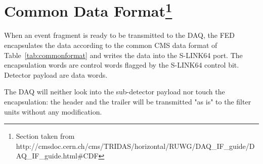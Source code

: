 \label{sec:CommonFormat}
\section[Common Data Format]{Common Data Format\footnote{Section taken from
http://cmsdoc.cern.ch/cms/TRIDAS/horizontal/RUWG/DAQ\_IF\_guide/DAQ\_IF\_guide.html\#CDF}}

When an event fragment is ready to be transmitted to the DAQ, the FED
encapsulates the data according to the common CMS data format of
Table~\ref{tab:commonformat} and writes the data into the S-LINK64 port. The
encapsulation words are control words flagged by the S-LINK64 control
bit. Detector payload are data words.

The DAQ will neither look into the sub-detector payload nor touch the
encapsulation: the header and the trailer will be transmitted "as is"
to the filter units without any modification.

